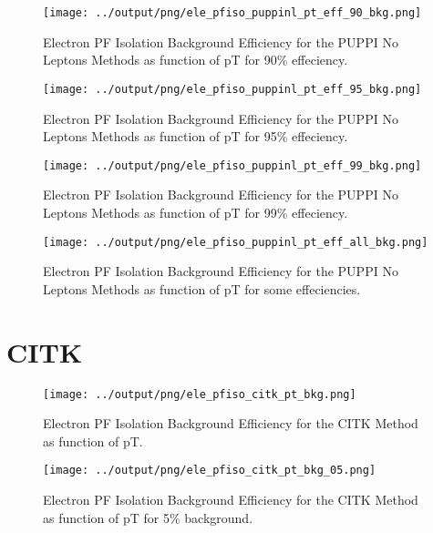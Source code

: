 \documentclass[11pt]{book}
\begin{document}
\begin{figure}[htb]
\centering
\texttt{[image: ../output/png/ele\_pfiso\_puppinl\_pt\_eff\_90\_bkg.png]}
\caption{Electron PF Isolation Background Efficiency for the PUPPI No Leptons Methods as function of pT for 90\% effeciency.}
\label{fig:ele_pfiso_pt_eff_puppinl_eff_90_bkg}
\end{figure}

\begin{figure}[htb]
\centering
\texttt{[image: ../output/png/ele\_pfiso\_puppinl\_pt\_eff\_95\_bkg.png]}
\caption{Electron PF Isolation Background Efficiency for the PUPPI No Leptons Methods as function of pT for 95\% effeciency.}
\label{fig:ele_pfiso_pt_eff_puppinl_eff_95_bkg}
\end{figure}

\begin{figure}[htb]
\centering
\texttt{[image: ../output/png/ele\_pfiso\_puppinl\_pt\_eff\_99\_bkg.png]}
\caption{Electron PF Isolation Background Efficiency for the PUPPI No Leptons Methods as function of pT for 99\% effeciency.}
\label{fig:ele_pfiso_pt_eff_puppinl_eff_99_bkg}
\end{figure}

\begin{figure}[htb]
\centering
\texttt{[image: ../output/png/ele\_pfiso\_puppinl\_pt\_eff\_all\_bkg.png]}
\caption{Electron PF Isolation Background Efficiency for the PUPPI No Leptons Methods as function of pT for some effeciencies.}
\label{fig:ele_pfiso_pt_eff_puppinl_eff_all_bkg}
\end{figure}
\clearpage

\section{CITK}
\begin{figure}[htb]
\centering
\texttt{[image: ../output/png/ele\_pfiso\_citk\_pt\_bkg.png]}
\caption{Electron PF Isolation Background Efficiency for the CITK Method as function of pT.}
\label{fig:ele_pfiso_pt_bkg_citk}
\end{figure}

\begin{figure}[htb]
\centering
\texttt{[image: ../output/png/ele\_pfiso\_citk\_pt\_bkg\_05.png]}
\caption{Electron PF Isolation Background Efficiency for the CITK Method as function of pT for 5\% background.}
\label{fig:ele_pfiso_pt_bkg_citk_bkg_05}
\end{figure}
\end{document}

